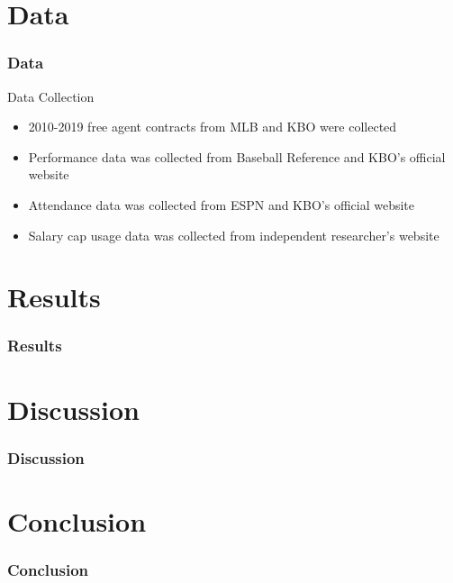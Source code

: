 \documentclass[9pt]{beamer}
\begin{document}
\section{Data}
\begin{frame}
    \frametitle{Data}
    \begin{block}
        {Data Collection}
        \begin{itemize}
            \item 2010-2019 free agent contracts from MLB and KBO were collected
            \item Performance data was collected from Baseball Reference and KBO's official website
            \item Attendance data was collected from ESPN and KBO's official website
            \item Salary cap usage data was collected from independent researcher's website
        \end{itemize}
    \end{block}
\end{frame}

\section{Results}
\begin{frame}
    \frametitle{Results}
\end{frame}

\section{Discussion}
\begin{frame}
    \frametitle{Discussion}
\end{frame}

\section{Conclusion}
\begin{frame}
    \frametitle{Conclusion}
\end{frame}
\end{document}
